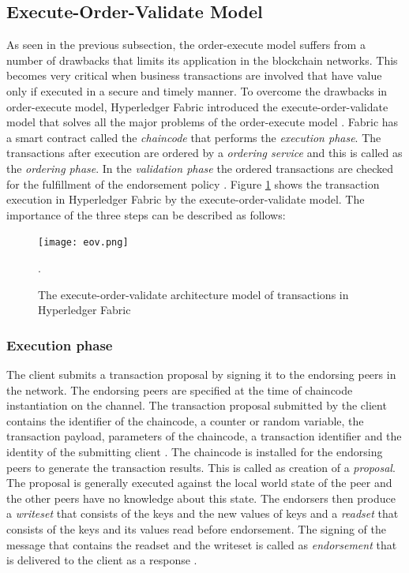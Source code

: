 \documentclass[
  a4paper,  %
  twoside,  %
  bibliography=totoc,
  headsepline,
  cleardoublepage=empty,
  parskip=half,
  draft=false
]{scrbook}
\begin{document}
\subsection{Execute-Order-Validate Model}
As seen in the previous subsection, the order-execute model suffers from a number of drawbacks that limits its application in the blockchain networks. This becomes very critical when business transactions are involved that have value only if executed in a secure and timely manner. To overcome the drawbacks in order-execute model, Hyperledger Fabric introduced the execute-order-validate model that solves all the major problems of the order-execute model \cite{HF}. Fabric has a smart contract called the \textit{chaincode} that performs the \textit{execution phase}. The transactions after execution are ordered by a \textit{ordering service} and this is called as the \textit{ordering phase}. In the \textit{validation phase} the ordered transactions are checked for the fulfillment of the endorsement policy \cite{HF}. Figure \ref{fig:eov} shows the transaction execution in Hyperledger Fabric by the execute-order-validate model. The importance of the three steps can be described as follows:

\begin{figure}[h!]
\begin{center}
\texttt{[image: eov.png]}
\caption{The execute-order-validate architecture model of transactions in Hyperledger Fabric \cite{HF}}.
\label{fig:eov}
\end{center}
\end{figure}

\subsubsection{Execution phase}
The client submits a transaction proposal by signing it to the endorsing peers in the network. The endorsing peers are specified at the time of chaincode instantiation on the channel. The transaction proposal submitted by the client contains the identifier of the chaincode, a counter or random variable, the transaction payload, parameters of the chaincode, a transaction identifier and the identity of the submitting client \cite{HF}. The chaincode is installed for the endorsing peers to generate the transaction results. This is called as creation of a \textit{proposal}. The proposal is generally executed against the local world state of the peer and the other peers have no knowledge about this state. The endorsers then produce a \textit{writeset} that consists of the keys and the new values of keys and a \textit{readset} that consists of the keys and its values read before endorsement. The signing of the message that contains the readset and the writeset is called as \textit{endorsement} that is delivered to the client as a response \cite{HF}.
\end{document}
